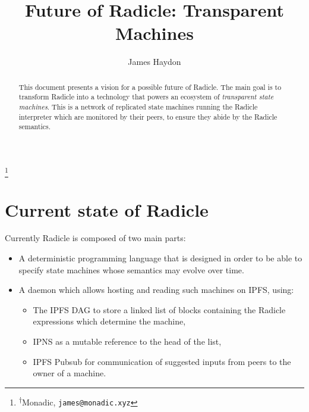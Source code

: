 \documentclass[a4paper, oneside, 10pt]{amsart}
\begin{document}
\title{Future of Radicle: Transparent Machines}
\date{}
\author{James Haydon}

\thanks{\textsuperscript{$\dagger$}Monadic, \texttt{james@monadic.xyz}}

\begin{abstract}
This document presents a vision for a possible future of Radicle. The main goal
is to transform Radicle into a technology that powers an ecosystem of
\emph{transparent state machines}. This is a network of replicated state
machines running the Radicle interpreter which are monitored by their peers, to
ensure they abide by the Radicle semantics.
\end{abstract}

\maketitle

\tableofcontents

\section{Current state of Radicle}

Currently Radicle is composed of two main parts:
\begin{itemize}
\item
  A deterministic programming language that is designed in order to be able to
  specify state machines whose semantics may evolve over time.
\item
  A daemon which allows hosting and reading such machines on IPFS, using:
  \begin{itemize}
  \item
    The IPFS DAG to store a linked list of blocks containing the Radicle
    expressions which determine the machine,
  \item
    IPNS as a mutable reference to the head of the list,
  \item
    IPFS Pubsub for communication of suggested inputs from peers to the owner of
    a machine.
  \end{itemize}
\end{itemize}
\end{document}
